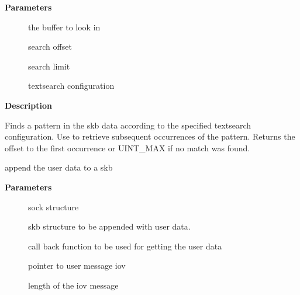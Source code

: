 \documentclass[a4paper,8pt,english]{sphinxmanual}
\begin{document}
\textbf{Parameters}
\begin{description}
\item[{}] \leavevmode
the buffer to look in

\item[{}] \leavevmode
search offset

\item[{}] \leavevmode
search limit

\item[{}] \leavevmode
textsearch configuration

\end{description}

\textbf{Description}

Finds a pattern in the skb data according to the specified
textsearch configuration. Use  to retrieve
subsequent occurrences of the pattern. Returns the offset
to the first occurrence or UINT\_MAX if no match was found.

\begin{fulllineitems}
\label{networking/kapi:c.skb_append_datato_frags}
append the user data to a skb

\end{fulllineitems}


\textbf{Parameters}
\begin{description}
\item[{}] \leavevmode
sock  structure

\item[{}] \leavevmode
skb structure to be appended with user data.

\item[{}] \leavevmode
call back function to be used for getting the user data

\item[{}] \leavevmode
pointer to user message iov

\item[{}] \leavevmode
length of the iov message

\end{description}
\end{document}
